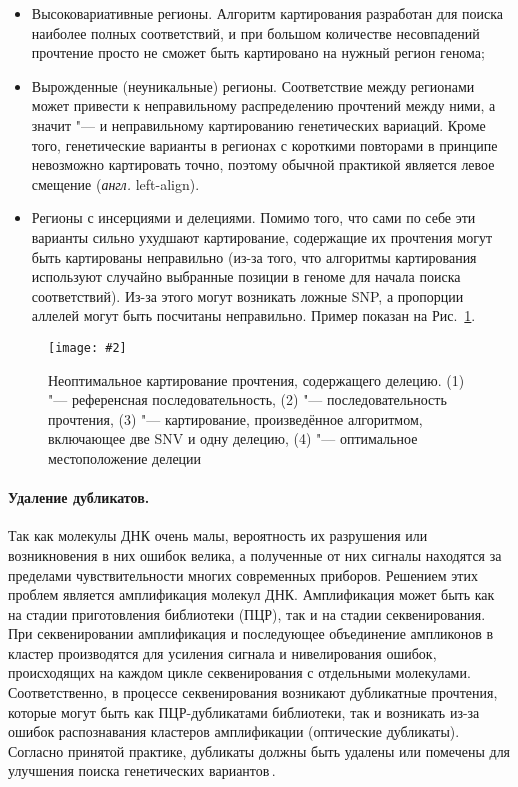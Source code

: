 \documentclass[a4paper,14pt]{extarticle}
\newcommand{\bigfiga}[5]{
\begin{figure}[#1]
\centering
\texttt{[image: \#2]}
\caption{\label{#3}#4}
\end{figure}
}
\newcommand{\ris}[1]{Рис.~\ref{#1}}
\newcommand{\anglia}[1]{\textit{англ.} \textenglish{#1}}
\begin{document}
\begin{itemize}
\item Высоковариативные регионы.
Алгоритм картирования разработан для поиска наиболее полных соответствий, и при большом количестве несовпадений прочтение просто не сможет быть картировано на нужный регион генома;
\item Вырожденные (неуникальные) регионы.
Соответствие между регионами может привести к неправильному распределению прочтений между ними, а значит "--- и неправильному картированию генетических вариаций.
Кроме того, генетические варианты в регионах с короткими повторами в принципе невозможно картировать точно, поэтому обычной практикой является левое смещение (\anglia{left-align}).
\item Регионы с инсерциями и делециями.
Помимо того, что сами по себе эти варианты сильно ухудшают картирование, содержащие их прочтения могут быть картированы неправильно (из-за того, что алгоритмы картирования используют случайно выбранные позиции в геноме для начала поиска соответствий).
Из-за этого могут возникать ложные SNP, а пропорции аллелей могут быть посчитаны неправильно.
Пример показан на \ris{fig:indels}.
\end{itemize}

\bigfiga{h}{Indels.pdf}{fig:indels}{Неоптимальное картирование прочтения, содержащего делецию. (1) "--- референсная последовательность, (2) "--- последовательность прочтения, (3) "--- картирование, произведённое алгоритмом, включающее две SNV и одну делецию, (4) "--- оптимальное местоположение делеции}{0.7}

\paragraph{Удаление дубликатов.}
Так как молекулы ДНК очень малы, вероятность их разрушения или возникновения в них ошибок велика, а полученные от них сигналы находятся за пределами чувствительности многих современных приборов.
Решением этих проблем является амплификация молекул ДНК.
Амплификация может быть как на стадии приготовления библиотеки (ПЦР), так и на стадии секвенирования.
При секвенировании амплификация и последующее объединение ампликонов в кластер производятся для усиления сигнала и нивелирования ошибок, происходящих на каждом цикле секвенирования с отдельными молекулами.
Соответственно, в процессе секвенирования возникают дубликатные прочтения, которые могут быть как ПЦР\hyp{}дубликатами библиотеки, так и возникать из-за ошибок распознавания кластеров амплификации (оптические дубликаты).
Согласно принятой практике, дубликаты должны быть удалены или помечены для улучшения поиска генетических вариантов\,\cite{Auwera_2013}.
\end{document}
